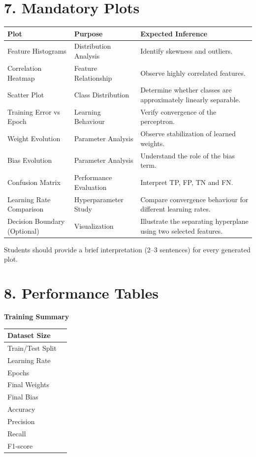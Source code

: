 \documentclass[11pt]{article}
\begin{document}

\section*{7. Mandatory Plots}

\begin{longtable}{|p{3.4cm}|p{3.4cm}|p{6cm}|}
\hline
\textbf{Plot} & \textbf{Purpose} & \textbf{Expected Inference}\\
\hline
Feature Histograms & Distribution Analysis & Identify skewness and outliers.\\
\hline
Correlation Heatmap & Feature Relationship & Observe highly correlated features.\\
\hline
Scatter Plot & Class Distribution & Determine whether classes are approximately linearly separable.\\
\hline
Training Error vs Epoch & Learning Behaviour & Verify convergence of the perceptron.\\
\hline
Weight Evolution & Parameter Analysis & Observe stabilization of learned weights.\\
\hline
Bias Evolution & Parameter Analysis & Understand the role of the bias term.\\
\hline
Confusion Matrix & Performance Evaluation & Interpret TP, FP, TN and FN.\\
\hline
Learning Rate Comparison & Hyperparameter Study & Compare convergence behaviour for different learning rates.\\
\hline
Decision Boundary (Optional) & Visualization & Illustrate the separating hyperplane using two selected features.\\
\hline
\end{longtable}

Students should provide a brief interpretation (2--3 sentences) for every generated plot.


\section*{8. Performance Tables}

\textbf{Training Summary}

\begin{tabular}{|p{6cm}|p{7cm}|}
\hline
Dataset Size &\\
\hline
Train/Test Split &\\
\hline
Learning Rate &\\
\hline
Epochs &\\
\hline
Final Weights &\\
\hline
Final Bias &\\
\hline
Accuracy &\\
\hline
Precision &\\
\hline
Recall &\\
\hline
F1-score &\\
\hline
\end{tabular}
\end{document}

